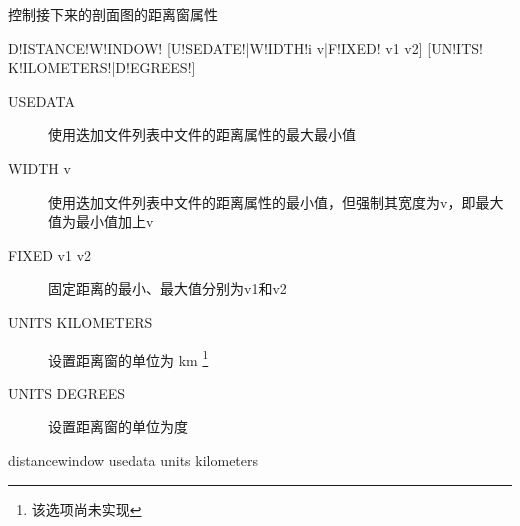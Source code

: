 \label{sss:distancewindow}

控制接下来的剖面图的距离窗属性

\begin{SACSTX}
D!ISTANCE!W!INDOW! [U!SEDATE!|W!IDTH!i v|F!IXED! v1 v2] [UN!ITS! K!ILOMETERS!|D!EGREES!]
\end{SACSTX}

\begin{description}
\item [USEDATA] 使用迭加文件列表中文件的距离属性的最大最小值
\item [WIDTH v] 使用迭加文件列表中文件的距离属性的最小值，但强制其宽度为v，即最大值为最小值加上v
\item [FIXED v1 v2] 固定距离的最小、最大值分别为v1和v2
\item [UNITS KILOMETERS] 设置距离窗的单位为 \si{\km} \footnote{该选项尚未实现}
\item [UNITS DEGREES] 设置距离窗的单位为度
\end{description}

\begin{SACDFT}
distancewindow usedata units kilometers
\end{SACDFT}
